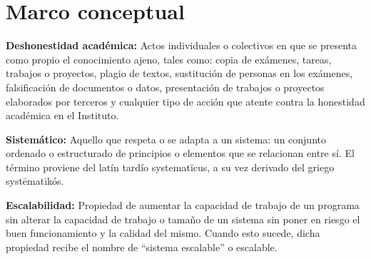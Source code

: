 \documentclass[../Main.tex]{subfiles}
\begin{document}
\section{Marco conceptual}
\begin{justify}
\textbf{Deshonestidad académica:} Actos individuales o colectivos en que se presenta como propio el conocimiento ajeno, tales como: copia de exámenes, tareas, trabajos o proyectos, plagio de textos, sustitución de personas en los exámenes, falsificación de documentos o datos, presentación de trabajos o proyectos elaborados por terceros y cualquier tipo de acción que atente contra la honestidad académica en el Instituto. 
\end{justify}\par

\begin{justify}
\textbf{Sistemático:} Aquello que respeta o se adapta a un sistema: un conjunto ordenado o estructurado de principios o elementos que se relacionan entre sí. El término proviene del latín tardío systematĭcus, a su vez derivado del griego systēmatikós.
\end{justify}\par

\begin{justify}
\textbf{Escalabilidad:} Propiedad de aumentar la capacidad de trabajo de un programa sin alterar la capacidad de trabajo o tamaño de un sistema sin poner en riesgo el buen funcionamiento y la calidad del mismo. Cuando esto sucede, dicha propiedad recibe el nombre de “sistema escalable” o escalable.
\end{justify}

\clearpage
\end{document}
